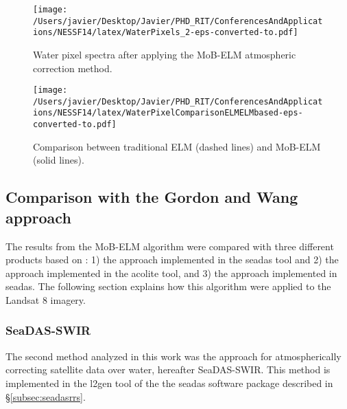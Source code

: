 \begin{figure}[htb]
    \centering
      \texttt{[image: /Users/javier/Desktop/Javier/PHD\_RIT/ConferencesAndApplications/NESSF14/latex/WaterPixels\_2-eps-converted-to.pdf]}
      \caption{Water pixel spectra after applying the MoB-ELM atmospheric correction method.}
      \label{fig:waterpxs}
\end{figure}


\begin{figure}[htb]
    \centering
      \texttt{[image: /Users/javier/Desktop/Javier/PHD\_RIT/ConferencesAndApplications/NESSF14/latex/WaterPixelComparisonELMELMbased-eps-converted-to.pdf]}
      \caption{Comparison between traditional ELM (dashed lines) and MoB-ELM (solid lines).}
      \label{fig:refcomp}
\end{figure}
\subsection{Comparison with the Gordon and Wang approach}
\label{subsec:GordonComp}
The results from the MoB-ELM algorithm were compared with three different products based on \citet{Gordon:1994}: 1) the \citet{Gordon:1994} approach implemented in the \gls{seadas} tool and 2) the \citet{Gordon:1994} approach implemented in the \gls{acolite} tool, and 3) the \citet{Ruddick:2000bs} approach implemented in \gls{seadas}. The following section explains how this algorithm were applied to the Landsat 8 imagery.
\subsubsection{SeaDAS-SWIR}
\label{subsubsec:seadasswir}
The second method analyzed in this work was the \citet{Gordon:1994} approach for atmospherically correcting satellite data over water, hereafter SeaDAS-SWIR. This method is implemented in the l2gen tool of the the \gls{seadas} software package described in \S\ref{subsec:seadasrrs}.


